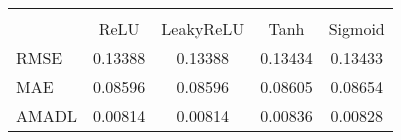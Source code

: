 \begin{tabular}{lcccc}
\hline\hline \\ [-1.8ex]
 & ReLU & LeakyReLU & Tanh & Sigmoid \\ 
 \hline 
RMSE & 0.13388 & 0.13388 & 0.13434 & 0.13433 \\ 
MAE & 0.08596 & 0.08596 & 0.08605 & 0.08654 \\ 
AMADL & 0.00814 & 0.00814 & 0.00836 & 0.00828 \\ 
\hline\hline
\end{tabular}